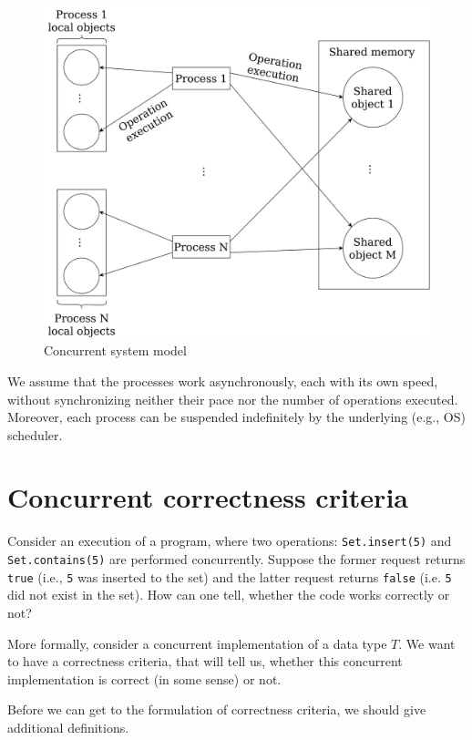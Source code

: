 \documentclass[times, dvipsnames,%
               languages={russian,english} %
              ]{itmo-student-thesis}
\begin{document}
\begin{figure}[H]
  \centering
  \caption{Concurrent system model}
  \label{model-pic}
  \includegraphics[width=\linewidth]{pics/model.png}
\end{figure}

We assume that the processes work asynchronously, each with its own speed, without synchronizing neither their pace nor the number of operations executed. Moreover, each process can be suspended indefinitely by the underlying (e.g., OS) scheduler.

\section{Concurrent correctness criteria}
\label{correctness-criteria-section}

Consider an execution of a program, where two operations: \texttt{Set.insert(5)} and \texttt{Set.contains(5)} are performed concurrently. Suppose the former request returns \texttt{true} (i.e., \texttt{5} was inserted to the set) and the latter request returns \texttt{false} (i.e. \texttt{5} did not exist in the set). How can one tell, whether the code works correctly or not?

More formally, consider a concurrent implementation of a data type $T$. We want to have a correctness criteria, that will tell us, whether this concurrent implementation is correct (in some sense) or not. 

Before we can get to the formulation of correctness criteria, we should give additional definitions.
\end{document}
